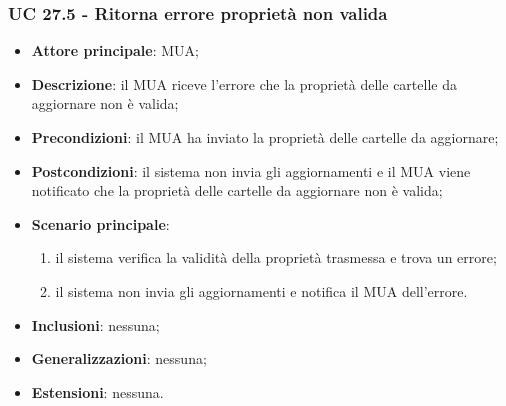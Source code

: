     \subsubsection{UC 27.5 - Ritorna errore proprietà non valida} \label{sec:UC27.5}
    \begin{itemize}
        \item \textbf{Attore principale}: MUA;
        \item \textbf{Descrizione}: il MUA riceve l'errore che la proprietà delle cartelle da aggiornare non è valida;
        \item \textbf{Precondizioni}: il MUA ha inviato la proprietà delle cartelle da aggiornare;
        \item \textbf{Postcondizioni}: il sistema non invia gli aggiornamenti e il MUA viene notificato che la proprietà delle cartelle da aggiornare non è valida;
        \item \textbf{Scenario principale}:
            \begin{enumerate}
                \item il sistema verifica la validità della proprietà trasmessa e trova un errore;
                \item il sistema non invia gli aggiornamenti e notifica il MUA dell'errore.
            \end{enumerate}
        \item \textbf{Inclusioni}: nessuna;
        \item \textbf{Generalizzazioni}: nessuna;
        \item \textbf{Estensioni}: nessuna.
    \end{itemize}